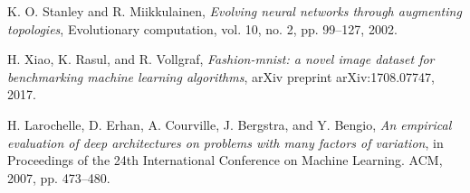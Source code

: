 \documentclass[conference]{IEEEtran}
\begin{document}
\begin{thebibliography}{11}
K. O. Stanley and R. Miikkulainen, \emph{Evolving neural networks through augmenting topologies}, Evolutionary computation, vol. 10, no. 2, pp. 99–127, 2002.

H. Xiao, K. Rasul, and R. Vollgraf, \emph{Fashion-mnist: a novel image dataset for benchmarking machine learning algorithms}, arXiv preprint arXiv:1708.07747, 2017.

H. Larochelle, D. Erhan, A. Courville, J. Bergstra, and Y. Bengio, \emph{An empirical evaluation of deep architectures on problems with many factors of variation}, in Proceedings of the 24th International Conference on Machine Learning. ACM, 2007, pp. 473–480.

\end{thebibliography}




\end{document}
